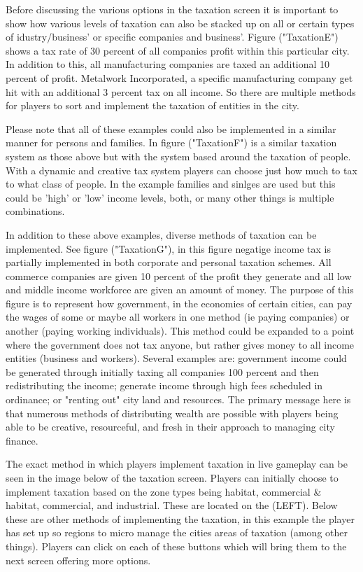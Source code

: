 Before discussing the various options in the taxation screen it is important to show how various levels of taxation can also be stacked up on all or certain types of idustry/business' or specific companies and business'.
Figure ("TaxationE") shows a tax rate of 30 percent of all companies profit within this particular city. In addition to this, all manufacturing companies are taxed an additional 10 percent of profit. Metalwork Incorporated, a specific manufacturing company get hit with an additional 3 percent tax on all income. So there are multiple methods for players to sort and implement the taxation of entities in the city. 

Please note that all of these examples could also be implemented in a similar manner for persons and families. In figure ("TaxationF") is a similar taxation system as those above but with the system based around the taxation of people. With a dynamic and creative tax system players can choose just how much to tax to what class of people. In the example families and sinlges are used but this could be 'high' or 'low' income levels, both, or many other things is multiple combinations.

In addition to these above examples, diverse methods of taxation can be implemented. See figure ("TaxationG"), in this figure negatige income tax is partially implemented in both corporate and personal taxation schemes. All commerce companies are given 10 percent of the profit they generate and all low and middle income workforce are given an amount of money. The purpose of this figure is to represent how government, in the economies of certain cities, can pay the wages of some or maybe all workers in one method (ie paying companies) or another (paying working individuals). This method could be expanded to a point where the government does not tax anyone, but rather gives money to all income entities (business and workers). Several examples are: government income could be generated through initially taxing all companies 100 percent and then redistributing the income; generate income through high fees scheduled in ordinance; or "renting out" city land and resources. The primary message here is that numerous methods of distributing wealth are possible with players being able to be creative, resourceful, and fresh in their approach to managing city finance.


The exact method in which players implement taxation in live gameplay can be seen in the image below of the taxation screen.
Players can initially choose to implement taxation based on the zone types being habitat, commercial &  habitat, commercial, and industrial. These are located on the (LEFT). Below these are other methods of implementing the taxation, in this example the player has set up so regions to micro manage the cities areas of taxation (among other things). Players can click on each of these buttons which will bring them to the next screen offering more options. 

